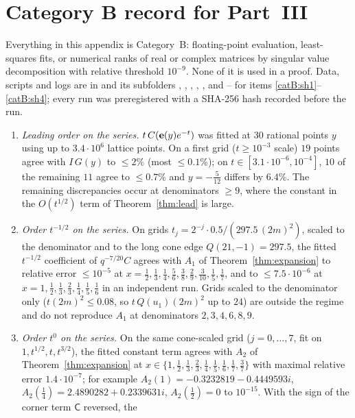 \section{Category B record for Part~III}\label{app:catB}
Everything in this appendix is Category~B: floating-point evaluation, least-squares fits, or numerical ranks of real or complex matrices by singular
value decomposition with relative threshold $10^{-9}$. None of it is used in a proof. Data, scripts and logs are in  and
its subfolders , , , , , and -- for items \ref{catB:sh1}--\ref{catB:sh4}; every run was preregistered with a SHA-256 hash recorded before the run.
\begin{enumerate}[label=D.\arabic*,leftmargin=3em]
\item\label{catB:lead} \emph{Leading order on the series.} $t\,C(\mathbf{e}(y)e^{-t})$ was fitted at $30$ rational points $y$ using up to $3.4\cdot10^6$ lattice points.
On a first grid ($t\ge10^{-3}$ scale) $19$ points agree with $I\,G(y)$ to $\le2\%$ (most $\le0.1\%$); on $t\in[3.1\cdot10^{-6},10^{-4}]$, $10$ of the remaining
$11$ agree to $\le0.7\%$ and $y=-\frac5{12}$ differs by $6.4\%$. The remaining discrepancies occur at denominators $\ge9$, where the constant in the $O(t^{1/2})$
term of Theorem~\ref{thm:lead} is large.
\item\label{catB:o2} \emph{Order $t^{-1/2}$ on the series.} On grids $t_j=2^{-j}\cdot0.5/(297.5\,(2m)^2)$, scaled to the denominator and to the long cone edge
$Q(21,-1)=297.5$, the fitted $t^{-1/2}$ coefficient of $q^{-7/20}C$ agrees with $A_1$ of Theorem~\ref{thm:expansion} to relative error $\le10^{-5}$ at
$x=\frac12,\frac13,\frac14,\frac56,\frac38,\frac29,\frac3{10},\frac15,\frac17$, and to $\le7.5\cdot10^{-6}$ at $x=1,\frac12,\frac13,\frac23,\frac14,\frac15,\frac16$ in an
independent run. Grids scaled to the denominator only ($t(2m)^2\le0.08$, so $t\,Q(u_1)(2m)^2$ up to $24$) are outside the regime and do not reproduce $A_1$ at
denominators $2,3,4,6,8,9$.
\item\label{catB:o3c} \emph{Order $t^0$ on the series.} On the same cone-scaled grid ($j=0,\dots,7$, fit on $1,t^{1/2},t,t^{3/2}$), the fitted constant term agrees with
$A_2$ of Theorem~\ref{thm:expansion} at $x\in\{1,\frac12,\frac13,\frac23,\frac14,\frac15,\frac16,\frac17,\frac37\}$ with maximal relative error $1.4\cdot10^{-7}$; for example
$A_2(1)=-0.3232819-0.4449593i$, $A_2(\frac14)=2.4890282+0.2339631i$, $A_2(\frac12)=0$ to $10^{-15}$. With the sign of the corner term $\mathsf C$ reversed, the

\end{enumerate}

